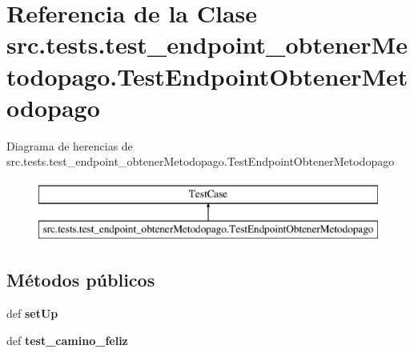 \hypertarget{classsrc_1_1tests_1_1test__endpoint__obtener_metodopago_1_1_test_endpoint_obtener_metodopago}{\section{Referencia de la Clase src.\-tests.\-test\-\_\-endpoint\-\_\-obtener\-Metodopago.\-Test\-Endpoint\-Obtener\-Metodopago}
\label{classsrc_1_1tests_1_1test__endpoint__obtener_metodopago_1_1_test_endpoint_obtener_metodopago}
}
Diagrama de herencias de src.\-tests.\-test\-\_\-endpoint\-\_\-obtener\-Metodopago.\-Test\-Endpoint\-Obtener\-Metodopago\begin{figure}[H]
\begin{center}
\leavevmode
\includegraphics[height=2.000000cm]{classsrc_1_1tests_1_1test__endpoint__obtener_metodopago_1_1_test_endpoint_obtener_metodopago}
\end{center}
\end{figure}
\subsection*{Métodos públicos}
\begin{DoxyCompactItemize}
\item 
\hypertarget{classsrc_1_1tests_1_1test__endpoint__obtener_metodopago_1_1_test_endpoint_obtener_metodopago_a0862cbdcc248d93ea1d2fff4c4a1cef1}{def {\bfseries set\-Up}}\label{classsrc_1_1tests_1_1test__endpoint__obtener_metodopago_1_1_test_endpoint_obtener_metodopago_a0862cbdcc248d93ea1d2fff4c4a1cef1}

\item 
\hypertarget{classsrc_1_1tests_1_1test__endpoint__obtener_metodopago_1_1_test_endpoint_obtener_metodopago_aad84c65ab3d91ab82fa508754dd7d081}{def {\bfseries test\-\_\-camino\-\_\-feliz}}\label{classsrc_1_1tests_1_1test__endpoint__obtener_metodopago_1_1_test_endpoint_obtener_metodopago_aad84c65ab3d91ab82fa508754dd7d081}

\end{DoxyCompactItemize}
